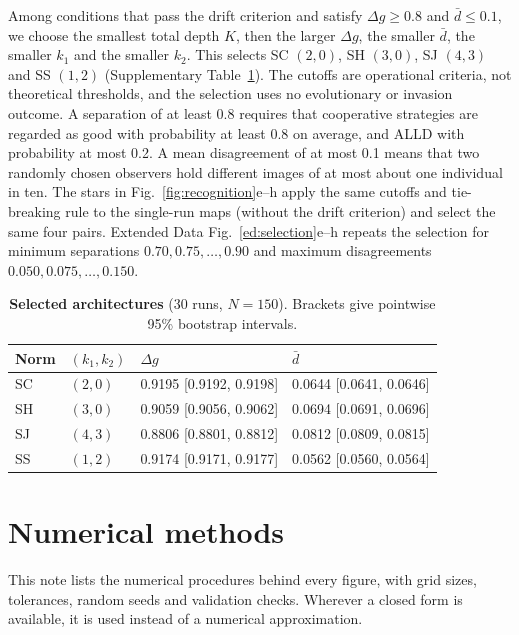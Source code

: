 \documentclass[10pt]{wlscirep}
\theoremstyle{plain}
\theoremstyle{remark}
\begin{document}
Among conditions that pass the drift criterion and satisfy $\Delta g\geq0.8$ and $\bar d\leq0.1$, we choose the smallest total depth $K$, then the larger $\Delta g$, the smaller $\bar d$, the smaller $k_1$ and the smaller $k_2$. This selects SC $(2,0)$, SH $(3,0)$, SJ $(4,3)$ and SS $(1,2)$ (Supplementary Table~\ref{tab:si-selected}). The cutoffs are operational criteria, not theoretical thresholds, and the selection uses no evolutionary or invasion outcome. A separation of at least 0.8 requires that cooperative strategies are regarded as good with probability at least 0.8 on average, and ALLD with probability at most 0.2. A mean disagreement of at most 0.1 means that two randomly chosen observers hold different images of at most about one individual in ten. The stars in Fig.~\ref{fig:recognition}e--h apply the same cutoffs and tie-breaking rule to the single-run maps (without the drift criterion) and select the same four pairs. Extended Data Fig.~\ref{ed:selection}e--h repeats the selection for minimum separations $0.70,0.75,\ldots,0.90$ and maximum disagreements $0.050,0.075,\ldots,0.150$.

\begin{table}[!htbp]
\centering
\caption{\textbf{Selected architectures} (30 runs, $N=150$). Brackets give pointwise 95\% bootstrap intervals.}
\label{tab:si-selected}
\small
\begin{tabular}{@{}llll@{}}
\toprule
Norm & $(k_1,k_2)$ & $\Delta g$ & $\bar d$\\
\midrule
SC & $(2,0)$ & 0.9195 [0.9192, 0.9198] & 0.0644 [0.0641, 0.0646]\\
SH & $(3,0)$ & 0.9059 [0.9056, 0.9062] & 0.0694 [0.0691, 0.0696]\\
SJ & $(4,3)$ & 0.8806 [0.8801, 0.8812] & 0.0812 [0.0809, 0.0815]\\
SS & $(1,2)$ & 0.9174 [0.9171, 0.9177] & 0.0562 [0.0560, 0.0564]\\
\bottomrule
\end{tabular}
\end{table}

\FloatBarrier
\section{Numerical methods}
\label{si:numerics}

This note lists the numerical procedures behind every figure, with grid sizes, tolerances, random seeds and validation checks. Wherever a closed form is available, it is used instead of a numerical approximation.
\end{document}
